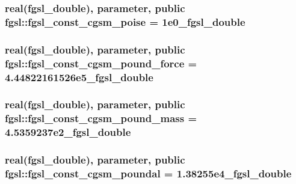 \hypertarget{classfgsl_ac2108186e2fec1e447f96ad1ab30ae23}{
\subsubsection[{fgsl\-\_\-const\-\_\-cgsm\-\_\-poise}]{\setlength{\rightskip}{0pt plus 5cm}real({\bf fgsl\-\_\-double}), parameter, public fgsl\-::fgsl\-\_\-const\-\_\-cgsm\-\_\-poise = 1e0\-\_\-fgsl\-\_\-double}}\label{classfgsl_ac2108186e2fec1e447f96ad1ab30ae23}
\hypertarget{classfgsl_a42219a1cda342fbf61675de1c4fa2e9a}{
\subsubsection[{fgsl\-\_\-const\-\_\-cgsm\-\_\-pound\-\_\-force}]{\setlength{\rightskip}{0pt plus 5cm}real({\bf fgsl\-\_\-double}), parameter, public fgsl\-::fgsl\-\_\-const\-\_\-cgsm\-\_\-pound\-\_\-force = 4.\-44822161526e5\-\_\-fgsl\-\_\-double}}\label{classfgsl_a42219a1cda342fbf61675de1c4fa2e9a}
\hypertarget{classfgsl_ae6b5172d0dcea9b11e99852be3ec5f1a}{
\subsubsection[{fgsl\-\_\-const\-\_\-cgsm\-\_\-pound\-\_\-mass}]{\setlength{\rightskip}{0pt plus 5cm}real({\bf fgsl\-\_\-double}), parameter, public fgsl\-::fgsl\-\_\-const\-\_\-cgsm\-\_\-pound\-\_\-mass = 4.\-5359237e2\-\_\-fgsl\-\_\-double}}\label{classfgsl_ae6b5172d0dcea9b11e99852be3ec5f1a}
\hypertarget{classfgsl_a4453ec263f2b4c5802122e762e1672c4}{
\subsubsection[{fgsl\-\_\-const\-\_\-cgsm\-\_\-poundal}]{\setlength{\rightskip}{0pt plus 5cm}real({\bf fgsl\-\_\-double}), parameter, public fgsl\-::fgsl\-\_\-const\-\_\-cgsm\-\_\-poundal = 1.\-38255e4\-\_\-fgsl\-\_\-double}}\label{classfgsl_a4453ec263f2b4c5802122e762e1672c4}
